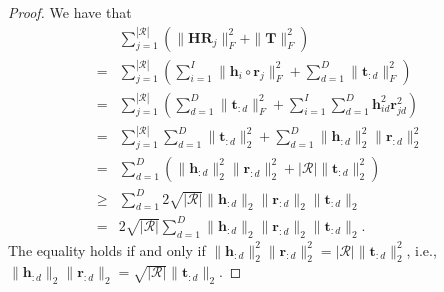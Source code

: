 \documentclass{article}
\begin{document}
\begin{proof}
We have that
\begin{align*}
    &\sum_{j=1}^{|\mathcal{R}|}\left(\|\textbf{H}\textbf{R}_j\|_F^2+\|\textbf{T}\|_F^2\right)\\
    =&\sum_{j=1}^{|\mathcal{R}|}\left(\sum_{i=1}^I\|\textbf{h}_{i}\circ \textbf{r}_{j}\|_F^2+\sum_{d=1}^D\|\textbf{t}_{:d}\|_F^2\right)\\
    =&\sum_{j=1}^{|\mathcal{R}|}\left(\sum_{d=1}^D\|\textbf{t}_{:d}\|_F^2+\sum_{i=1}^I\sum_{d=1}^D\textbf{h}_{id}^2\textbf{r}_{jd}^2\right)\\
=&\sum_{j=1}^{|\mathcal{R}|}\sum_{d=1}^D\|\textbf{t}_{:d}\|_2^2+\sum_{d=1}^D\|\textbf{h}_{:d}\|_2^2\|\textbf{r}_{:d}\|_2^2\\
    =&\sum_{d=1}^D(\|\textbf{h}_{:d}\|_2^2\|\textbf{r}_{:d}\|_2^2+|\mathcal{R}|\|\textbf{t}_{:d}\|_2^2)\\
    \ge& \sum_{d=1}^D2\sqrt{|\mathcal{R}|}\|\textbf{h}_{:d}\|_2\|\textbf{r}_{:d}\|_2\|\textbf{t}_{:d}\|_2\\
    =&2\sqrt{|\mathcal{R}|}\sum_{d=1}^D\|\textbf{h}_{:d}\|_2\|\textbf{r}_{:d}\|_2\|\textbf{t}_{:d}\|_2.
\end{align*}
The equality holds if and only if $\|\textbf{h}_{:d}\|_2^2\|\textbf{r}_{:d}\|_2^2=|\mathcal{R}|\|\textbf{t}_{:d}\|_2^2$, i.e., $\|\textbf{h}_{:d}\|_2\|\textbf{r}_{:d}\|_2=\sqrt{|\mathcal{R}|}\|\textbf{t}_{:d}\|_2$.


\end{proof}
\end{document}
